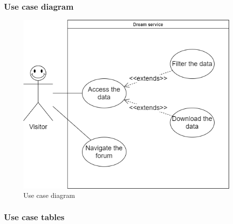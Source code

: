 \subsubsection*{Use case diagram}
    \begin{figure}[hbt!]
        \centering
        \includegraphics[scale=0.40]{images/use_cases_diagram/visitor_use_case.png}
        \caption{Use case diagram}
        \label{fig:vistor_use_case}
    \end{figure}
\FloatBarrier
    
\subsubsection*{Use case tables}

